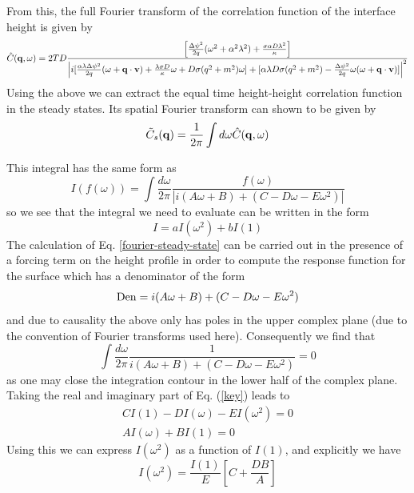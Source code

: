 From this, the full Fourier transform of the correlation function of the interface height is given by
\begin{equation}
    \hat C({\bf q},\omega)  = 2TD \frac{\left[ \frac{\Delta\psi^2}{2q}(\omega^2+\alpha^2 \lambda^2) + \frac{\sigma\alpha D\lambda^2}{\kappa}\right]}{\left|i[\frac{\alpha\lambda\Delta\psi^2}{2 q}(\omega + {\bf q}\cdot{\bf v}) + \frac{\lambda \sigma D}{\kappa}\omega + D\sigma(q^2+m^2)\omega]
+[\alpha\lambda D\sigma(q^2+m^2) -\frac{\Delta\psi^2}{2q}\omega(\omega+{\bf q}\cdot{\bf v})]\right|^2}
\end{equation}
Using the above we can extract the equal time height-height correlation function in the steady states. Its spatial Fourier transform can shown to be given by
\begin{align}
    \tilde C_s({\bf q}) = \frac{1}{2\pi} \int d\omega \hat C({\bf q}, \omega)
    \label{fourier-steady-state}
\end{align}

This integral has the same form as 
\begin{equation}
I(f(\omega)) = \int \frac{d\omega}{2\pi} \frac{f(\omega)}{\left|i(A\omega + B) + (C-D\omega-E \omega^2)\right|}
\end{equation}
so we see that the integral we need to evaluate can be written in the form
\begin{equation}
I = a I(\omega^2) + b I(1)
\end{equation}
The calculation of Eq. \eqref{fourier-steady-state} can be carried out in the presence of a forcing term on the height profile in order to compute the response function for the surface which has a denominator of the form
\begin{equation}
{\rm Den} = i(A\omega + B) + (C-D\omega-E \omega^2)
\end{equation}
and due to causality the above only has poles in the upper complex plane (due to the convention of Fourier transforms used here). Consequently we find that
\begin{equation}
    \int \frac{d\omega}{2\pi} \frac{1}{i(A\omega + B) + (C-D\omega-E \omega^2)} = 0
    \label{key}
\end{equation}
as one may close the integration contour in the lower half of the complex plane. Taking the real and imaginary part of Eq. (\ref{key}) leads to
\begin{eqnarray}
C I(1) -D I(\omega) - E I(\omega^2) = 0 \\
AI(\omega) + B I(1) = 0
\end{eqnarray}
Using this we can express $I(\omega^2)$ as a function of $I(1)$, and explicitly we have 
\begin{equation}
I(\omega^2) = \frac{I(1)}{E}[C+ \frac{DB}{A}]
\end{equation}

